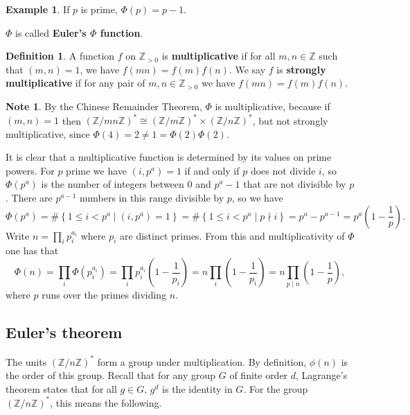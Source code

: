 \documentclass{article}
\newcommand{\Z}{\mathbb{Z}}
\newcommand{\rb}[1]{\left( #1 \right)}
\newcommand{\cb}[1]{\left\{ #1 \right\}}
\theoremstyle{definition}\newtheorem{definition}{Definition}
\theoremstyle{definition}\newtheorem*{remark}{Remark}
\theoremstyle{definition}\newtheorem*{example}{Example}
\theoremstyle{definition}\newtheorem*{note}{Note}
\begin{document}
\begin{example}
If $ p $ is prime, $ \Phi\rb{p} = p - 1 $.
\end{example}

$ \Phi $ is called \textbf{Euler's $ \Phi $ function}.

\begin{definition}
A function $ f $ on $ \Z_{> 0} $ is \textbf{multiplicative} if for all $ m, n \in \Z $ such that $ \rb{m, n} = 1 $, we have $ f\rb{mn} = f\rb{m}f\rb{n} $. We say $ f $ is \textbf{strongly multiplicative} if for any pair of $ m, n \in \Z_{> 0} $ we have $ f\rb{mn} = f\rb{m}f\rb{n} $.
\end{definition}

\begin{note}
By the Chinese Remainder Theorem, $ \Phi $ is multiplicative, because if $ \rb{m, n} = 1 $ then $ \rb{\Z / mn\Z}^* \cong \rb{\Z / m\Z}^* \times \rb{\Z / n\Z}^* $, but not strongly multiplicative, since $ \Phi\rb{4} = 2 \ne 1 = \Phi\rb{2}\Phi\rb{2} $.
\end{note}

It is clear that a multiplicative function is determined by its values on prime powers. For $ p $ prime we have $ \rb{i, p^a} = 1 $ if and only if $ p $ does not divide $ i $, so $ \Phi\rb{p^a} $ is the number of integers between $ 0 $ and $ p^a - 1 $ that are not divisible by $ p $. There are $ p^{a - 1} $ numbers in this range divisible by $ p $, so we have
$$ \Phi\rb{p^a} = \#\cb{1 \le i < p^a \mid \rb{i, p^a} = 1} = \#\cb{1 \le i < p^a \mid p \nmid i} = p^a - p^{a - 1} = p^a\rb{1 - \dfrac{1}{p}}. $$
Write $ n = \prod_i p_i^{a_i} $ where $ p_i $ are distinct primes. From this and multiplicativity of $ \Phi $ one has that
$$ \Phi\rb{n} = \prod_i \Phi\rb{p_i^{a_i}} = \prod_i p_i^{a_i}\rb{1 - \dfrac{1}{p_i}} = n\prod_i \rb{1 - \dfrac{1}{p_i}} = n\prod_{p \mid n} \rb{1 - \dfrac{1}{p}}, $$
where $ p $ runs over the primes dividing $ n $.

\subsection{Euler's theorem}

The units $ \rb{\Z / n\Z}^* $ form a group under multiplication. By definition, $ \phi\rb{n} $ is the order of this group. Recall that for any group $ G $ of finite order $ d $, Lagrange's theorem states that for all $ g \in G $, $ g^d $ is the identity in $ G $. For the group $ \rb{\Z / n\Z}^* $, this means the following.
\end{document}
